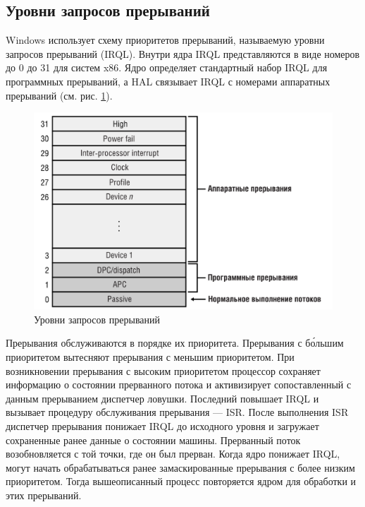 \documentclass[a4paper,oneside,14pt]{extreport}
\begin{document}
	\subsection{Уровни запросов прерываний}
	Windows использует схему приоритетов прерываний, называемую уровни запросов прерываний (IRQL). Внутри ядра IRQL представляются в виде номеров до 0 до 31 для систем x86. Ядро определяет стандартный набор IRQL для программных прерываний, а HAL связывает IRQL с номерами аппаратных прерываний (см. рис. \ref{fig:ts}).
	\begin{figure}[H]
		\centering
		\includegraphics[scale=0.45]{images/irql}
		\caption{Уровни запросов прерываний}
		\label{fig:ts}
	\end{figure}
	Прерывания обслуживаются в порядке их приоритета. Прерывания с б\'{о}льшим приоритетом вытесняют прерывания с меньшим приоритетом.
	При возникновении прерывания с высоким приоритетом процессор сохраняет информацию о состоянии прерванного потока и активизирует сопоставленный с данным прерыванием диспетчер ловушки. Последний повышает IRQL и вызывает процедуру обслуживания прерывания --- ISR. После выполнения ISR диспетчер прерывания понижает IRQL до исходного уровня и загружает сохраненные ранее данные о состоянии машины. Прерванный поток возобновляется с той точки, где он был прерван. Когда ядро понижает IRQL, могут начать обрабатываться ранее замаскированные прерывания с более низким приоритетом. Тогда вышеописанный процесс повторяется ядром для обработки и этих прерываний.
\end{document}
